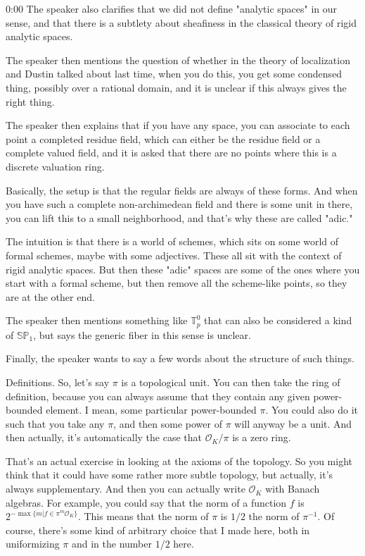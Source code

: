 \begin{unfinished}{0:00}
The speaker also clarifies that we did not define "analytic spaces" in our sense, and that there is a subtlety about sheafiness in the classical theory of rigid analytic spaces.

The speaker then mentions the question of whether in the theory of localization and Dustin talked about last time, when you do this, you get some condensed thing, possibly over a rational domain, and it is unclear if this always gives the right thing.

The speaker then explains that if you have any space, you can associate to each point a completed residue field, which can either be the residue field or a complete valued field, and it is asked that there are no points where this is a discrete valuation ring.

Basically, the setup is that the regular fields are always of these forms. And when you have such a complete non-archimedean field and there is some unit in there, you can lift this to a small neighborhood, and that's why these are called "adic."

The intuition is that there is a world of schemes, which sits on some world of formal schemes, maybe with some adjectives. These all sit with the context of rigid analytic spaces. But then these "adic" spaces are some of the ones where you start with a formal scheme, but then remove all the scheme-like points, so they are at the other end.

The speaker then mentions something like $\mathbb{T}_p^0$ that can also be considered a kind of $\mathbb{SP}_1$, but says the generic fiber in this sense is unclear.

Finally, the speaker wants to say a few words about the structure of such things.

Definitions. So, let's say $\pi$ is a topological unit. You can then take the ring of definition, because you can always assume that they contain any given power-bounded element. I mean, some particular power-bounded $\pi$. You could also do it such that you take any $\pi$, and then some power of $\pi$ will anyway be a unit. And then actually, it's automatically the case that $\mathcal{O}_K/\pi$ is a zero ring.

That's an actual exercise in looking at the axioms of the topology. So you might think that it could have some rather more subtle topology, but actually, it's always supplementary. And then you can actually write $\mathcal{O}_K$ with Banach algebras. For example, you could say that the norm of a function $f$ is $2^{-\max\{m|f\in\pi^m\mathcal{O}_K\}}$. This means that the norm of $\pi$ is $1/2$ the norm of $\pi^{-1}$. Of course, there's some kind of arbitrary choice that I made here, both in uniformizing $\pi$ and in the number $1/2$ here.


\end{unfinished}

